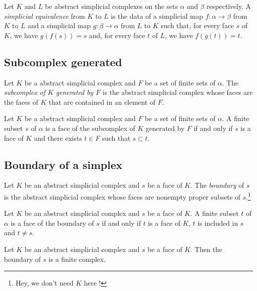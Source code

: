 \begin{subdefi}[AbstractSimplicialComplexEquiv]
Let $K$ and $L$ be abstract simplicial complexes on the sets $\alpha$ and $\beta$ respectively. A \emph{simplicial equivalence} from $K$ to $L$
is the data of a simplicial map $f:\alpha\to\beta$ from $K$ to $L$ and a simplicial map $g:\beta\to\alpha$ from $L$ to $K$ such that, for
every face $s$ of $K$, we have $g(f(s))=s$ and, for every face $t$ of $L$, we have $f(g(t))=t$.

\end{subdefi}


\subsection{Subcomplex generated}

\begin{subdefi}[SubcomplexGenerated]
Let $K$ be a abstract simplicial complex and $F$ be a set of finite sets of $\alpha$. The \emph{subcomplex of $K$ generated by $F$} is the abstract
simplicial complex whose faces are the faces of $K$ that are contained in an element of $F$.

\end{subdefi}

\begin{sublemma}
Let $K$ be a abstract simplicial complex and $F$ be a set of finite sets of $\alpha$.
A finite subset $s$ of $\alpha$ is a face of the subcomplex of $K$ generated by $F$ if and only if $s$ is a face of $K$ and there exists $t\in F$ such that
$s \subset t$.

\end{sublemma}

\subsection{Boundary of a simplex}

\begin{subdefi}[Boundary]
Let $K$ be an abstract simplicial complex and $s$ be a face of $K$. The \emph{boundary} of $s$ is the abstract simplicial complex whose faces
are nonempty proper subsets of $s$.\footnote{Hey, we don't need $K$ here !}

\end{subdefi}

\begin{sublemma}
Let $K$ be an abstract simplicial complex and $s$ be a face of $K$. A finite subset $t$ of $\alpha$ is a face of the boundary of $s$ if and only
if $t$ is a face of $K$, $t$ is included in $s$ and $t \ne s$.

\end{sublemma}

\begin{sublemma}[BoundaryFinite]
Let $K$ be an abstract simplicial complex and $s$ be a face of $K$. Then the boundary of $s$ is a finite complex.

\end{sublemma}